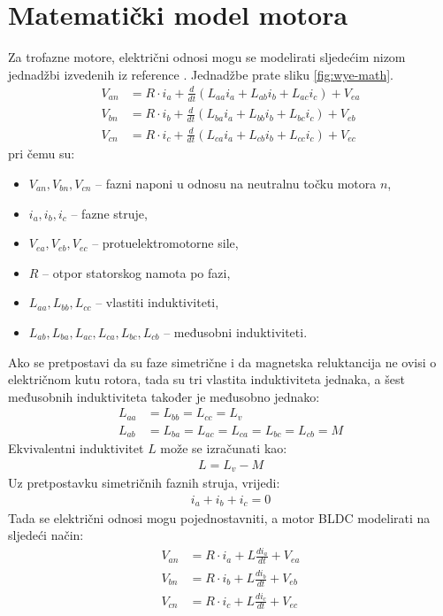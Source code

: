 \documentclass[diplomskirad]{fer}
\begin{document}
\section{Matematički model motora}
\label{sec:mat_model}
Za trofazne motore, električni odnosi mogu se modelirati sljedećim nizom jednadžbi izvedenih iz reference \cite{cite:pmsha}. Jednadžbe prate sliku \ref{fig:wye-math}.
\begin{align}
	V_{an} & = R \cdot i_a + \frac{d}{dt}(L_{aa}i_a + L_{ab}i_b + L_{ac}i_c) + V_{ea} \\
	V_{bn} & = R \cdot i_b + \frac{d}{dt}(L_{ba}i_a + L_{bb}i_b + L_{bc}i_c) + V_{eb} \\
	V_{cn} & = R \cdot i_c + \frac{d}{dt}(L_{ca}i_a + L_{cb}i_b + L_{cc}i_c) + V_{ec}
\end{align}
pri čemu su:
\begin{itemize}
	\item $V_{an}, V_{bn}, V_{cn}$ -- fazni naponi u odnosu na neutralnu točku motora $n$,
	\item $i_a, i_b, i_c$ -- fazne struje,
	\item $V_{ea}, V_{eb}, V_{ec}$ -- protuelektromotorne sile,
	\item $R$ -- otpor statorskog namota po fazi,
	\item $L_{aa}, L_{bb}, L_{cc}$ -- vlastiti induktiviteti,
	\item $L_{ab}, L_{ba}, L_{ac}, L_{ca}, L_{bc}, L_{cb}$ -- međusobni induktiviteti.
\end{itemize}
Ako se pretpostavi da su faze simetrične i da magnetska reluktancija ne ovisi o
električnom kutu rotora, tada su tri vlastita induktiviteta jednaka, a šest
međusobnih induktiviteta također je međusobno jednako:
\begin{align}
	L_{aa} & = L_{bb} = L_{cc} = L_v                          \\
	L_{ab} & = L_{ba} = L_{ac} = L_{ca} = L_{bc} = L_{cb} = M
\end{align}
Ekvivalentni induktivitet $L$ može se izračunati kao:
\begin{align}
	L = L_v - M
\end{align}
Uz pretpostavku simetričnih faznih struja, vrijedi:
\begin{align}
	i_a + i_b + i_c = 0
\end{align}
Tada se električni odnosi mogu pojednostavniti, a motor BLDC modelirati na
sljedeći način:
\begin{align}
	V_{an} & = R \cdot i_a + L\frac{di_a}{dt} + V_{ea} \\
	V_{bn} & = R \cdot i_b + L\frac{di_b}{dt} + V_{eb} \\
	V_{cn} & = R \cdot i_c + L\frac{di_c}{dt} + V_{ec}
\end{align}
\end{document}

